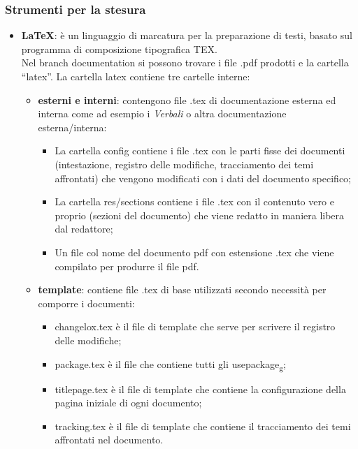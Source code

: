 \subsubsection{Strumenti per la stesura}
\begin{itemize} 
    \item \textbf{LaTeX}: è un linguaggio di marcatura per la preparazione di testi, basato sul 				  		  programma di composizione tipografica TEX.\\
	Nel branch documentation  si possono trovare i file .pdf prodotti e la cartella “latex”. La cartella latex contiene tre cartelle interne:
	\begin{itemize}
	\item \textbf{esterni e interni}: contengono file .tex di documentazione esterna ed interna come ad esempio i \textit{Verbali} o altra documentazione esterna/interna:
	\begin{itemize}
		\item La cartella config contiene i file .tex con le parti fisse dei documenti (intestazione, registro delle modifiche, tracciamento dei temi affrontati) che vengono modificati con i dati del documento specifico;
		\item La cartella res/sections contiene i file .tex con il contenuto vero e proprio (sezioni del documento) che viene redatto in maniera libera dal redattore;
		\item Un file col nome del documento pdf con estensione .tex che viene compilato per produrre il file pdf.
	\end{itemize}
	 \item \textbf{template}: contiene file .tex di base utilizzati secondo necessità per comporre i documenti:
	 \begin{itemize}
	 \item changelox.tex è il file di template che serve per scrivere il registro delle modifiche;
	 \item package.tex è il file che contiene tutti gli usepackage\textsubscript{g};
	 \item titlepage.tex è il file di template che contiene la configurazione della pagina iniziale di ogni documento;  
	 \item tracking.tex è il file di template che contiene il tracciamento dei temi affrontati nel documento.
	 \end{itemize}
	\end{itemize}
\end{itemize}